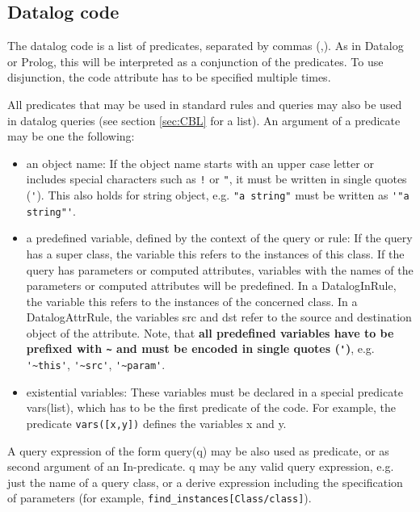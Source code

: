 \subsection{Datalog code}

The datalog code is a list of predicates, separated by commas (,). As in Datalog or Prolog,
this will be interpreted as a conjunction of the predicates. To use disjunction, the {\ttfamily code}
attribute has to be specified multiple times.

All predicates that may be used in standard rules and queries may also be
used in datalog queries (see section \ref{sec:CBL} for a list). An argument of a predicate
may be one the following:

\begin{itemize}
\item an object name: If the object name starts with an upper case letter or includes special characters such as \verb+!+ or \verb+"+,
it must be written in single quotes (\verb+'+). This also holds for string object, e.g. \verb+"a string"+
must be written as \verb+'"a string"'+.
\item a predefined variable, defined by the context of the query or rule: If the query has a super class,
the variable {\ttfamily this} refers to the instances of this class. If the query has parameters
or computed attributes, variables with the names of the parameters or computed attributes will be predefined.
In a {\ttfamily DatalogInRule}, the variable {\ttfamily this} refers to the instances of the concerned class.
In a {\ttfamily DatalogAttrRule}, the variables {\ttfamily src} and {\ttfamily dst} refer to the source
and destination object of the attribute. Note, that {\bfseries all predefined variables have to be prefixed with
\verb+~+ and must be encoded in single quotes (\verb+'+)}, e.g. \verb+'~this'+, \verb+'~src'+, \verb+'~param'+.
\item existential variables: These variables must be declared in a special predicate {\ttfamily vars(list)},
which has to be the first predicate of the code. For example, the predicate \verb+vars([x,y])+ defines
the variables {\ttfamily x} and {\ttfamily y}.
\end{itemize}

A query expression of the form {\ttfamily query(q)} may be also used as predicate, or as second
argument of an In-predicate. {\ttfamily q} may be any valid query expression, e.g. just the
name of a query class, or a derive expression including the specification of parameters
(for example, \verb+find_instances[Class/class]+).

